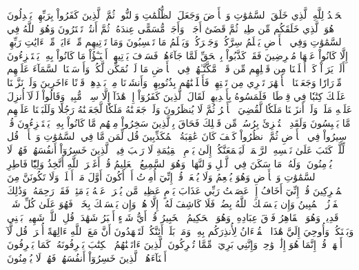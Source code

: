 ٱلۡحَمۡدُ لِلَّهِ ٱلَّذِي خَلَقَ ٱلسَّمَٰوَٰتِ وَٱلۡأَرۡضَ وَجَعَلَ ٱلظُّلُمَٰتِ وَٱلنُّورَۖ ثُمَّ ٱلَّذِينَ كَفَرُواْ بِرَبِّهِمۡ يَعۡدِلُونَ
هُوَ ٱلَّذِي خَلَقَكُم مِّن طِينٖ ثُمَّ قَضَىٰٓ أَجَلٗاۖ وَأَجَلٞ مُّسَمًّى عِندَهُۥۖ ثُمَّ أَنتُمۡ تَمۡتَرُونَ
وَهُوَ ٱللَّهُ فِي ٱلسَّمَٰوَٰتِ وَفِي ٱلۡأَرۡضِ يَعۡلَمُ سِرَّكُمۡ وَجَهۡرَكُمۡ وَيَعۡلَمُ مَا تَكۡسِبُونَ
وَمَا تَأۡتِيهِم مِّنۡ ءَايَةٖ مِّنۡ ءَايَٰتِ رَبِّهِمۡ إِلَّا كَانُواْ عَنۡهَا مُعۡرِضِينَ
فَقَدۡ كَذَّبُواْ بِٱلۡحَقِّ لَمَّا جَآءَهُمۡ فَسَوۡفَ يَأۡتِيهِمۡ أَنۢبَـٰٓؤُاْ مَا كَانُواْ بِهِۦ يَسۡتَهۡزِءُونَ
أَلَمۡ يَرَوۡاْ كَمۡ أَهۡلَكۡنَا مِن قَبۡلِهِم مِّن قَرۡنٖ مَّكَّنَّـٰهُمۡ فِي ٱلۡأَرۡضِ مَا لَمۡ نُمَكِّن لَّكُمۡ وَأَرۡسَلۡنَا ٱلسَّمَآءَ عَلَيۡهِم مِّدۡرَارٗا وَجَعَلۡنَا ٱلۡأَنۡهَٰرَ تَجۡرِي مِن تَحۡتِهِمۡ فَأَهۡلَكۡنَٰهُم بِذُنُوبِهِمۡ وَأَنشَأۡنَا مِنۢ بَعۡدِهِمۡ قَرۡنًا ءَاخَرِينَ
وَلَوۡ نَزَّلۡنَا عَلَيۡكَ كِتَٰبٗا فِي قِرۡطَاسٖ فَلَمَسُوهُ بِأَيۡدِيهِمۡ لَقَالَ ٱلَّذِينَ كَفَرُوٓاْ إِنۡ هَٰذَآ إِلَّا سِحۡرٞ مُّبِينٞ
وَقَالُواْ لَوۡلَآ أُنزِلَ عَلَيۡهِ مَلَكٞۖ وَلَوۡ أَنزَلۡنَا مَلَكٗا لَّقُضِيَ ٱلۡأَمۡرُ ثُمَّ لَا يُنظَرُونَ
وَلَوۡ جَعَلۡنَٰهُ مَلَكٗا لَّجَعَلۡنَٰهُ رَجُلٗا وَلَلَبَسۡنَا عَلَيۡهِم مَّا يَلۡبِسُونَ
وَلَقَدِ ٱسۡتُهۡزِئَ بِرُسُلٖ مِّن قَبۡلِكَ فَحَاقَ بِٱلَّذِينَ سَخِرُواْ مِنۡهُم مَّا كَانُواْ بِهِۦ يَسۡتَهۡزِءُونَ
قُلۡ سِيرُواْ فِي ٱلۡأَرۡضِ ثُمَّ ٱنظُرُواْ كَيۡفَ كَانَ عَٰقِبَةُ ٱلۡمُكَذِّبِينَ
قُل لِّمَن مَّا فِي ٱلسَّمَٰوَٰتِ وَٱلۡأَرۡضِۖ قُل لِّلَّهِۚ كَتَبَ عَلَىٰ نَفۡسِهِ ٱلرَّحۡمَةَۚ لَيَجۡمَعَنَّكُمۡ إِلَىٰ يَوۡمِ ٱلۡقِيَٰمَةِ لَا رَيۡبَ فِيهِۚ ٱلَّذِينَ خَسِرُوٓاْ أَنفُسَهُمۡ فَهُمۡ لَا يُؤۡمِنُونَ
۞وَلَهُۥ مَا سَكَنَ فِي ٱلَّيۡلِ وَٱلنَّهَارِۚ وَهُوَ ٱلسَّمِيعُ ٱلۡعَلِيمُ
قُلۡ أَغَيۡرَ ٱللَّهِ أَتَّخِذُ وَلِيّٗا فَاطِرِ ٱلسَّمَٰوَٰتِ وَٱلۡأَرۡضِ وَهُوَ يُطۡعِمُ وَلَا يُطۡعَمُۗ قُلۡ إِنِّيٓ أُمِرۡتُ أَنۡ أَكُونَ أَوَّلَ مَنۡ أَسۡلَمَۖ وَلَا تَكُونَنَّ مِنَ ٱلۡمُشۡرِكِينَ
قُلۡ إِنِّيٓ أَخَافُ إِنۡ عَصَيۡتُ رَبِّي عَذَابَ يَوۡمٍ عَظِيمٖ
مَّن يُصۡرَفۡ عَنۡهُ يَوۡمَئِذٖ فَقَدۡ رَحِمَهُۥۚ وَذَٰلِكَ ٱلۡفَوۡزُ ٱلۡمُبِينُ
وَإِن يَمۡسَسۡكَ ٱللَّهُ بِضُرّٖ فَلَا كَاشِفَ لَهُۥٓ إِلَّا هُوَۖ وَإِن يَمۡسَسۡكَ بِخَيۡرٖ فَهُوَ عَلَىٰ كُلِّ شَيۡءٖ قَدِيرٞ
وَهُوَ ٱلۡقَاهِرُ فَوۡقَ عِبَادِهِۦۚ وَهُوَ ٱلۡحَكِيمُ ٱلۡخَبِيرُ
قُلۡ أَيُّ شَيۡءٍ أَكۡبَرُ شَهَٰدَةٗۖ قُلِ ٱللَّهُۖ شَهِيدُۢ بَيۡنِي وَبَيۡنَكُمۡۚ وَأُوحِيَ إِلَيَّ هَٰذَا ٱلۡقُرۡءَانُ لِأُنذِرَكُم بِهِۦ وَمَنۢ بَلَغَۚ أَئِنَّكُمۡ لَتَشۡهَدُونَ أَنَّ مَعَ ٱللَّهِ ءَالِهَةً أُخۡرَىٰۚ قُل لَّآ أَشۡهَدُۚ قُلۡ إِنَّمَا هُوَ إِلَٰهٞ وَٰحِدٞ وَإِنَّنِي بَرِيٓءٞ مِّمَّا تُشۡرِكُونَ
ٱلَّذِينَ ءَاتَيۡنَٰهُمُ ٱلۡكِتَٰبَ يَعۡرِفُونَهُۥ كَمَا يَعۡرِفُونَ أَبۡنَآءَهُمُۘ ٱلَّذِينَ خَسِرُوٓاْ أَنفُسَهُمۡ فَهُمۡ لَا يُؤۡمِنُونَ
